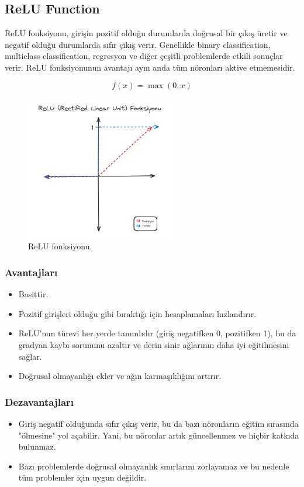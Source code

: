 \newpage

\subsection{ReLU Function}
ReLU fonksiyonu, girişin pozitif olduğu durumlarda doğrusal bir çıkış üretir ve negatif olduğu durumlarda sıfır çıkış verir. Genellikle binary classification, multiclass classification, regresyon ve diğer çeşitli problemlerde etkili sonuçlar verir. ReLU fonksiyonunun avantajı aynı anda tüm nöronları aktive etmemesidir.

\[f(x) = \max(0, x)\]

\begin{figure}[h]
    \centering
    \includegraphics[width=0.6\textwidth]{images/relu_function.png}
    \caption{ReLU fonksiyonu.}
    \label{fig:enter-label}
\end{figure}

\subsubsection{Avantajları}
\begin{itemize}
    \item Basittir.
    \item Pozitif girişleri olduğu gibi bıraktığı için hesaplamaları hızlandırır.
    \item ReLU'nun türevi her yerde tanımlıdır (giriş negatifken 0, pozitifken 1), bu da gradyan kaybı sorununu azaltır ve derin sinir ağlarının daha iyi eğitilmesini sağlar.
    \item Doğrusal olmayanlığı ekler ve ağın karmaşıklığını artırır.
\end{itemize}

\subsubsection{Dezavantajları}
\begin{itemize}
    \item Giriş negatif olduğunda sıfır çıkış verir, bu da bazı nöronların eğitim sırasında "ölmesine" yol açabilir. Yani, bu nöronlar artık güncellenmez ve hiçbir katkıda bulunmaz.
    \item Bazı problemlerde doğrusal olmayanlık sınırlarını zorlayamaz ve bu nedenle tüm problemler için uygun değildir.
\end{itemize}

